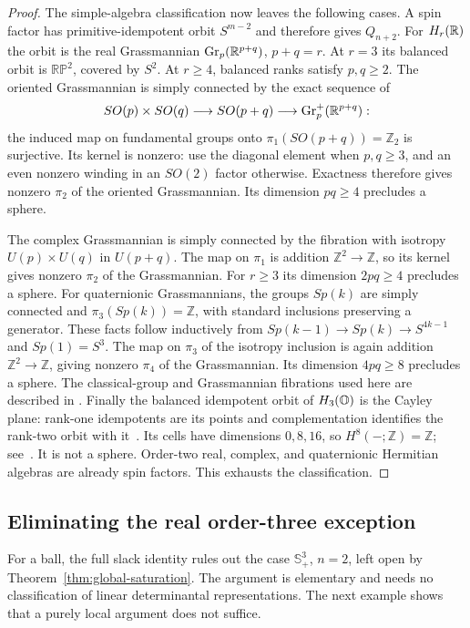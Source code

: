 \begin{proof}
The simple-algebra classification now leaves the following cases.
A spin factor has primitive-idempotent orbit $S^{m-2}$ and therefore gives
$Q_{n+2}$. For $H_r(\mathbb R)$ the orbit is the real Grassmannian
$\operatorname{Gr}_p(\mathbb R^{p+q})$, $p+q=r$. At $r=3$ its balanced orbit is
$\mathbb{RP}^2$, covered by $S^2$. At $r\geq4$, balanced ranks satisfy
$p,q\geq2$. The oriented Grassmannian is simply connected by the exact
sequence of
\[
 SO(p)\times SO(q)\longrightarrow SO(p+q)
 \longrightarrow\operatorname{Gr}_p^+(\mathbb R^{p+q}):
\]
the induced map on fundamental groups onto $\pi_1(SO(p+q))=\mathbb Z_2$
is surjective. Its kernel is nonzero: use the diagonal element when
$p,q\geq3$, and an even nonzero winding in an $SO(2)$ factor otherwise.
Exactness therefore gives nonzero $\pi_2$ of the oriented Grassmannian.
Its dimension $pq\geq4$ precludes a sphere.

The complex Grassmannian is simply connected by the fibration with
isotropy $U(p)\times U(q)$ in $U(p+q)$. The map on $\pi_1$ is addition
$\mathbb Z^2\to\mathbb Z$, so its kernel gives nonzero $\pi_2$ of the
Grassmannian. For $r\geq3$ its dimension $2pq\geq4$ precludes a sphere.
For quaternionic Grassmannians, the groups $Sp(k)$ are simply connected
and $\pi_3(Sp(k))=\mathbb Z$, with standard inclusions preserving a
generator. These facts follow inductively from
$Sp(k-1)\to Sp(k)\to S^{4k-1}$ and $Sp(1)=S^3$.
The map on $\pi_3$ of the isotropy inclusion is again addition
$\mathbb Z^2\to\mathbb Z$, giving nonzero $\pi_4$ of the Grassmannian.
Its dimension $4pq\geq8$ precludes a sphere. The classical-group and
Grassmannian fibrations used here are described in
\cite[Examples~4.53--4.55]{Hatcher2002}.
Finally the balanced idempotent orbit of $H_3(\mathbb O)$ is the Cayley plane:
rank-one idempotents are its points and complementation identifies the
rank-two orbit with it~\cite[Section~3.4]{Baez2002}.
Its cells have dimensions $0,8,16$, so $H^8(-;\mathbb Z)=\mathbb Z$;
see~\cite[Example~4.47]{Hatcher2002}. It is not a sphere.
Order-two real, complex, and quaternionic Hermitian algebras are already
spin factors. This exhausts the classification.
\end{proof}

\subsection{Eliminating the real order-three exception}
For a ball, the full slack identity rules out the case
$\mathbb S_+^3$, $n=2$, left open by Theorem~\ref{thm:global-saturation}.
The argument is elementary and needs no classification of linear
determinantal representations. The next example shows that a purely
local argument does not suffice.

